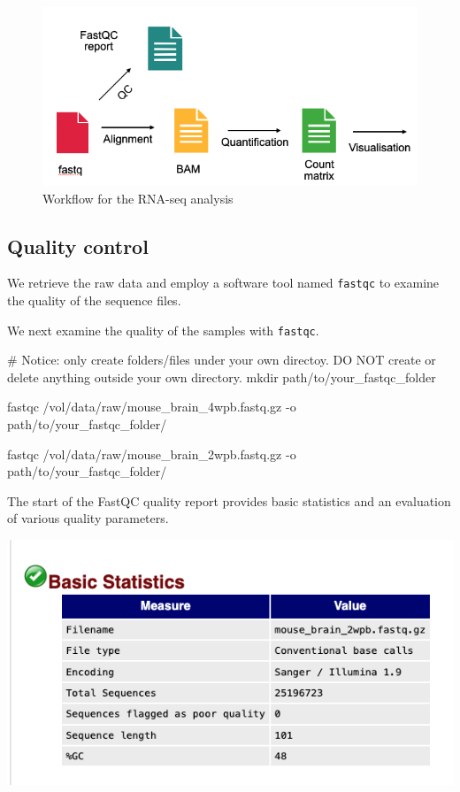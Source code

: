 \documentclass[
]{book}
\newenvironment{Shaded}{\begin{snugshade}}{\end{snugshade}}
\newcommand{\NormalTok}[1]{#1}
\begin{document}
\begin{figure}
\centering
\includegraphics{figures/workflow.png}
\caption{Workflow for the RNA-seq analysis}
\end{figure}

\hypertarget{quality-control}{%
\subsection{Quality control}\label{quality-control}}

We retrieve the raw data and employ a software tool named \texttt{fastqc} to examine the quality of the sequence files.

We next examine the quality of the samples with \texttt{fastqc}.

\begin{Shaded}
\begin{Highlighting}[]
\NormalTok{\# Notice: only create folders/files under your own directoy. DO NOT create or delete anything outside your own directory.}
\NormalTok{mkdir path/to/your\_fastqc\_folder }

\NormalTok{fastqc /vol/data/raw/mouse\_brain\_4wpb.fastq.gz {-}o path/to/your\_fastqc\_folder/}

\NormalTok{fastqc /vol/data/raw/mouse\_brain\_2wpb.fastq.gz {-}o path/to/your\_fastqc\_folder/}
\end{Highlighting}
\end{Shaded}

The start of the FastQC quality report provides basic statistics and an evaluation of various quality parameters.

\includegraphics{figures/fastqc_statistics.png}
\end{document}
